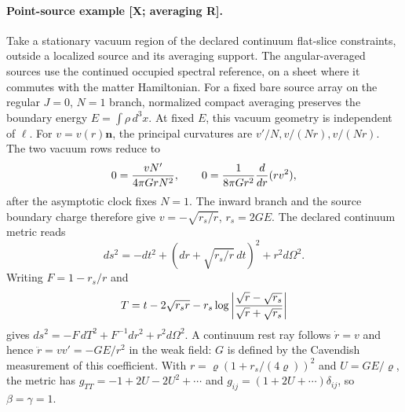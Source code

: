 
\paragraph{Point-source example [X; averaging R].}
Take a stationary vacuum region of the declared continuum flat-slice
constraints, outside a localized source and its averaging support.
The angular-averaged sources use the continued occupied spectral reference,
on a sheet where it commutes with the matter Hamiltonian.
For a fixed bare source array on the regular $J=0$, $N=1$ branch,
normalized compact averaging preserves the boundary energy
$E=\int\rho\,d^3x$. At fixed $E$, this vacuum geometry is independent of $\ell$.
For $v=v(r)\boldsymbol n$, the principal curvatures
are $v'/N,v/(Nr),v/(Nr)$.  The two vacuum rows reduce to
\[
 0={vN'\over4\pi G rN^2},\qquad
 0={1\over8\pi G r^2}{d\over dr}(rv^2),
\]
after the asymptotic clock fixes $N=1$.  The inward branch and the source
boundary charge therefore give $v=-\sqrt{r_s/r}$, $r_s=2GE$.
The declared continuum metric reads
\[
 ds^2=-dt^2+(dr+\sqrt{r_s/r}\,dt)^2+r^2d\Omega^2 .
\]
Writing $F=1-r_s/r$ and
\[
 T=t-2\sqrt{r_s r}
      -r_s\log\left|{\sqrt r-\sqrt{r_s}\over\sqrt r+\sqrt{r_s}}\right|
\]
gives $ds^2=-F\,dT^2+F^{-1}dr^2+r^2d\Omega^2$.
A continuum rest ray follows $\dot r=v$ and hence
$\ddot r=vv'=-GE/r^2$ in the weak field: $G$ is defined by the Cavendish
measurement of this coefficient.  With $r=\varrho(1+r_s/(4\varrho))^2$
and $U=GE/\varrho$, the metric
has $g_{TT}=-1+2U-2U^2+\cdots$ and $g_{ij}=(1+2U+\cdots)\delta_{ij}$,
so $\beta=\gamma=1$.

